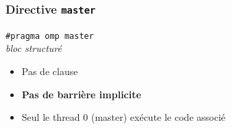 \documentclass{beamer}
\newcommand{\mynote}[1]{\note<1>[item]{#1}}
\begin{document}







\begin{frame}
  \frametitle{Directive {\tt master}} 

\begin{framed}
  {\tt \#pragma omp master }  \\
  {\it bloc structuré} 
\end{framed}


\bigskip

\begin{itemize}
\item Pas de clause

\item  \alert{\bfseries Pas de barrière implicite}

\item Seul le thread 0 (master) exécute le code associé
\end{itemize}
  
\end{frame}
\end{document}
